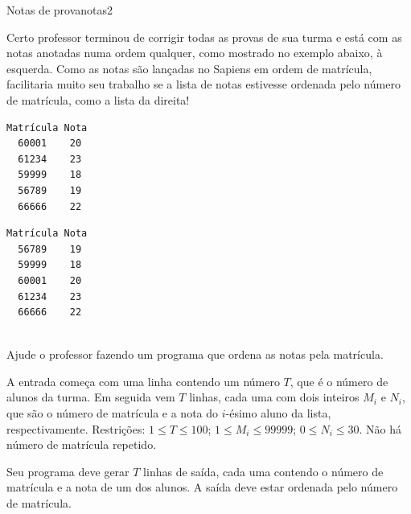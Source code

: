 \documentclass[12pt,a4paper,oneside]{article}
\begin{document}
\begin{problem}{Notas de prova}{notas}{2}

Certo professor terminou de corrigir todas as provas de sua turma e está com as notas anotadas numa ordem qualquer, como mostrado no exemplo abaixo, à esquerda. Como as notas são lançadas no Sapiens em ordem de matrícula, facilitaria muito seu trabalho se a lista de notas estivesse ordenada pelo número de matrícula, como a lista da direita!\\

\hspace{3cm}\begin{minipage}{.3\linewidth}
\begin{verbatim}
Matrícula Nota
  60001    20
  61234    23
  59999    18
  56789    19
  66666    22
\end{verbatim}
\end{minipage}\hspace{3cm}
\begin{minipage}{.3\linewidth}
\begin{verbatim}
Matrícula Nota
  56789    19
  59999    18
  60001    20
  61234    23
  66666    22
\end{verbatim}
\end{minipage}\\

Ajude o professor fazendo um programa que ordena as notas pela matrícula.




\InputFile

A entrada começa com uma linha contendo um número $T$, que é o número de alunos da turma. Em seguida vem $T$ linhas, cada uma com dois inteiros $M_i$ e $N_i$, que são o número de matrícula e a nota do $i$-ésimo aluno da lista, respectivamente. Restrições: $1 \leq T \leq 100$; $1 \leq M_i \leq 99999$; $0 \leq N_i \leq 30$. Não há número de matrícula repetido.

\OutputFile

Seu programa deve gerar $T$ linhas de saída, cada uma contendo o número de matrícula e a nota de um dos alunos. A saída deve estar ordenada pelo número de matrícula.


\Example

\begin{example}
%
\end{example}


\end{problem}
\end{document}
